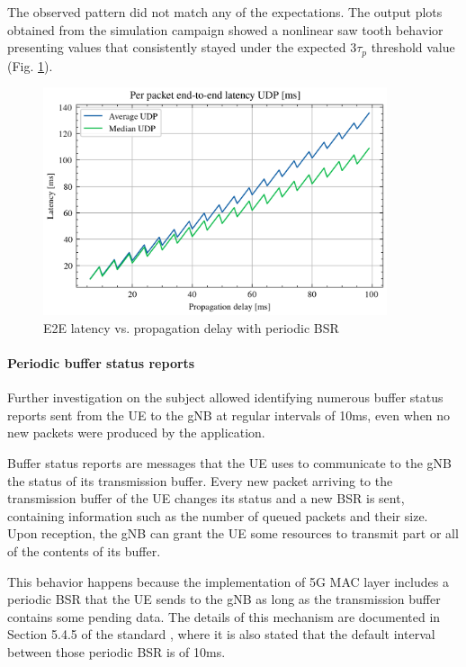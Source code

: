 The observed pattern did not match any of the expectations. The output plots obtained from the simulation campaign showed a nonlinear saw tooth behavior presenting values that consistently stayed under the expected $3\tau_p$ threshold value (Fig. \ref{fig:lat-saw}).

\begin{figure}[ht]
    \centering
    \includegraphics[width=0.9\textwidth]{res/lat-udp-saw.png}
    \caption{E2E latency vs. propagation delay with periodic \ac{BSR}}
    \label{fig:lat-saw}
\end{figure}

\paragraph{Periodic buffer status reports} Further investigation on the subject allowed identifying numerous buffer status reports sent from the \ac{UE} to the \ac{gNB} at regular intervals of 10ms, even when no new packets were produced by the application.

Buffer status reports are messages that the \ac{UE} uses to communicate to the \ac{gNB} the status of its transmission buffer. Every new packet arriving to the transmission buffer of the \ac{UE} changes its status and a new \ac{BSR} is sent, containing information such as the number of queued packets and their size. Upon reception, the \ac{gNB} can grant the \ac{UE} some resources to transmit part or all of the contents of its buffer.

This behavior happens because the implementation of 5G \ac{MAC} layer includes a periodic \ac{BSR} that the \ac{UE} sends to the \ac{gNB} as long as the transmission buffer contains some pending data.
The details of this mechanism are documented in Section 5.4.5 of the standard \cite{etsi-mac-specification}, where it is also stated that the default interval between those periodic \ac{BSR} is of 10ms.

